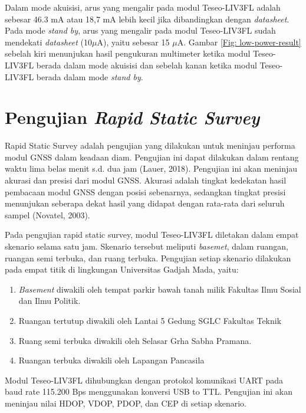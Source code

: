 Dalam mode akuisisi, arus yang mengalir pada modul Teseo-LIV3FL adalah sebesar 46.3 mA atau  18,7 mA lebih kecil jika dibandingkan dengan \textit{datasheet}. Pada mode \textit{stand by}, arus yang mengalir pada modul Teseo-LIV3FL sudah mendekati \textit{datasheet} (10$\mu$A), yaitu sebesar 15 $\mu$A. Gambar \ref{Fig: low-power-result} sebelah kiri menunjukan hasil pengukuran multimeter ketika modul Teseo-LIV3FL berada dalam mode akuisisi dan sebelah kanan ketika modul Teseo-LIV3FL berada dalam mode \textit{stand by}.

\section{Pengujian \textit{Rapid Static Survey}}
Rapid Static Survey adalah pengujian yang dilakukan untuk meninjau performa modul GNSS dalam keadaan diam. Pengujian ini dapat dilakukan dalam rentang waktu lima belas menit s.d. dua jam (Lauer, 2018). Pengujian ini akan meninjau akurasi dan presisi dari modul GNSS. Akurasi adalah tingkat kedekatan hasil pembacaan modul GNSS dengan posisi sebenarnya, sedangkan tingkat presisi menunjukan seberapa dekat hasil yang didapat dengan rata-rata dari seluruh sampel (Novatel, 2003).

Pada pengujian rapid static survey, modul Teseo-LIV3FL diletakan dalam empat skenario selama satu jam. Skenario tersebut meliputi \textit{basemet}, dalam ruangan, ruangan semi terbuka, dan ruang terbuka. Pengujian setiap skenario dilakukan pada empat titik di lingkungan Universitas Gadjah Mada, yaitu:
\begin{enumerate}
	\item \textit{Basement} diwakili oleh tempat parkir bawah tanah milik Fakultas Ilmu Sosial dan Ilmu Politik.
	\item Ruangan tertutup diwakili oleh Lantai 5 Gedung SGLC Fakultas Teknik
	\item Ruang semi terbuka diwakili oleh Selasar Grha Sabha Pramana.
	\item Ruangan terbuka diwakili oleh Lapangan Pancasila
\end{enumerate}

Modul Teseo-LIV3FL dihubungkan dengan protokol komunikasi UART pada baud rate 115.200 Bps menggunakan konversi USB to TTL. Pengujian ini akan meninjau nilai HDOP, VDOP, PDOP, dan CEP di setiap skenario.

